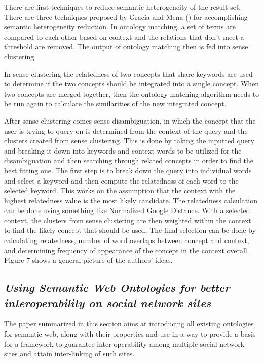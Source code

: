 \documentclass[10pt,journal,compsoc]{IEEEtran}
\begin{document}
There are first techniques to reduce semantic heterogeneity of the result set. There are three techniques proposed by Gracia and Mena (\cite{gracia_dealing_2011}) for accomplishing semantic heterogeneity reduction. In ontology matching, a set of terms are compared to each other based on context and the relations that don't meet a threshold are removed. The output of ontology matching then is fed into sense clustering. 

In sense clustering the relatedness of two concepts that share keywords are used to determine if the two concepts should be integrated into a single concept. When two concepts are merged together, then the ontology matching algorithm needs to be run again to calculate the similarities of the new integrated concept.

After sense clustering comes sense disambiguation, in which the concept that the user is trying to query on is determined from the context of the query and the clusters created from sense clustering. This is done by taking the inputted query and breaking it down into keywords and context words to be utilized for the disambiguation and then searching through related concepts in order to find the best fitting one. The first step is to break down the query into individual words and select a keyword and then compute the relatedness of each word to the selected keyword. This works on the assumption that the context with the highest relatedness value is the most likely candidate. The relatedness calculation can be done using something like Normalized Google Distance. With a selected context, the clusters from sense clustering are then weighted within the context to find the likely concept that should be used. The final selection can be done by calculating relatedness, number of word overlaps between concept and context, and determining frequency of appearance of the concept in the context overall. Figure 7 shows a general picture of the authors' ideas.




\subsection{\textit{Using Semantic Web Ontologies for better interoperability on social network sites} \cite{6190504}}
The paper summarized in this section aims at introducing all existing ontologies for semantic web, along with their properties and use in a way to provide a basis for a framework to guarantee inter-operability among multiple social network sites and attain inter-linking of such sites.
\end{document}
